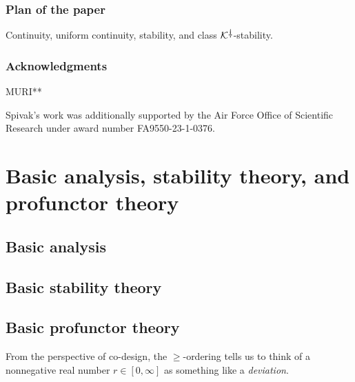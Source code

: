 \documentclass[11pt, one side, article]{memoir}
\theoremstyle{definition}
\theoremstyle{plain}
\newcommand{\cat}[1]{\mathcal{#1}}%
\newcommand{\ldag}{^{\rotatebox{180}{$\dagger$}}}
\newcommand{\K}{\cat{K}}
\newcommand{\Kdag}[1][0]{\K\ldag}
\begin{document}
\subsection{Plan of the paper}

Continuity, 
uniform continuity, 
stability, and
class $\Kdag$-stability.

\subsection*{Acknowledgments}

MURI**

Spivak's work was additionally supported by the Air Force Office of Scientific Research under award number FA9550-23-1-0376.


\chapter{Basic analysis, stability theory, and profunctor theory}
\label{chap.stability_and_profunctors}


\section{Basic analysis}



\section{Basic stability theory}

\section{Basic profunctor theory}


From the perspective of co-design, the $\geq$-ordering tells us to think of a nonnegative real number $r\in[0,\infty]$ as something like a \emph{deviation}.
\end{document}

